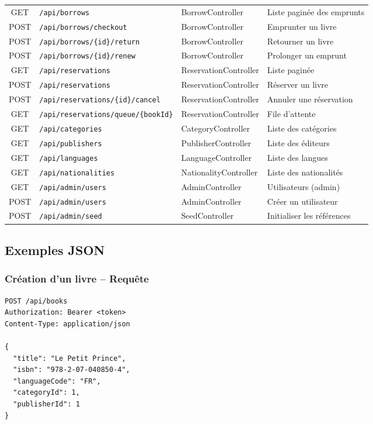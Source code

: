 \documentclass[12pt,a4paper]{article}
\begin{document}
\begin{center}
\begin{longtable}{|c|p{3.2cm}|p{2.8cm}|p{5cm}|}
GET & \texttt{/api/borrows} & BorrowController & Liste pagin\'ee des emprunts \\
POST & \texttt{/api/borrows/checkout} & BorrowController & Emprunter un livre \\
POST & \texttt{/api/borrows/\{id\}/return} & BorrowController & Retourner un livre \\
POST & \texttt{/api/borrows/\{id\}/renew} & BorrowController & Prolonger un emprunt \\
GET & \texttt{/api/reservations} & ReservationController & Liste pagin\'ee \\
POST & \texttt{/api/reservations} & ReservationController & R\'eserver un livre \\
POST & \texttt{/api/reservations/\{id\}/cancel} & ReservationController & Annuler une r\'eservation \\
GET & \texttt{/api/reservations/queue/\{bookId\}} & ReservationController & File d'attente \\
GET & \texttt{/api/categories} & CategoryController & Liste des cat\'egories \\
GET & \texttt{/api/publishers} & PublisherController & Liste des \'editeurs \\
GET & \texttt{/api/languages} & LanguageController & Liste des langues \\
GET & \texttt{/api/nationalities} & NationalityController & Liste des nationalit\'es \\
GET & \texttt{/api/admin/users} & AdminController & Utilisateurs (admin) \\
POST & \texttt{/api/admin/users} & AdminController & Cr\'eer un utilisateur \\
POST & \texttt{/api/admin/seed} & SeedController & Initialiser les r\'ef\'erences \\
\hline
\end{longtable}
\end{center}

\subsection{Exemples JSON}

\subsubsection{Cr\'eation d'un livre -- Requ\^ete}
\begin{lstlisting}[style=jsonstyle]
POST /api/books
Authorization: Bearer <token>
Content-Type: application/json

{
  "title": "Le Petit Prince",
  "isbn": "978-2-07-040850-4",
  "languageCode": "FR",
  "categoryId": 1,
  "publisherId": 1
}
\end{lstlisting}
\end{document}
